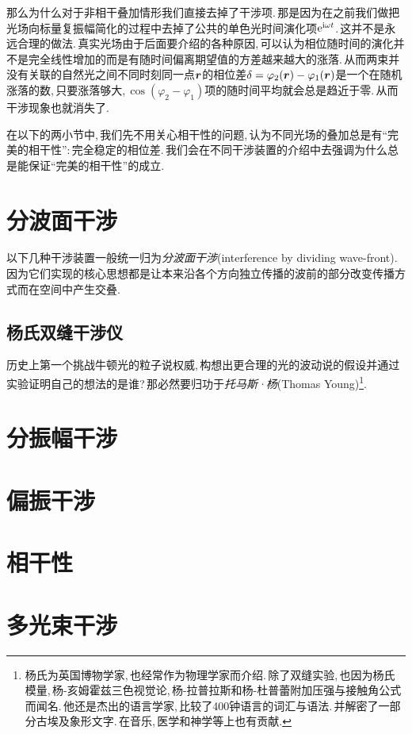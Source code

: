 那么为什么对于非相干叠加情形我们直接去掉了干涉项.\,那是因为在之前我们做把光场向标量复振幅简化的过程中去掉了公共的单色光时间演化项${\rm e} ^{{\rm i} \omega t}$.\,这并不是永远合理的做法.\,真实光场由于后面要介绍的各种原因,\,可以认为相位随时间的演化并不是完全线性增加的而是有随时间偏离期望值的方差越来越大的涨落.\,从而两束并没有关联的自然光之间不同时刻同一点$\boldsymbol{r}$的相位差$\delta=\varphi_2(\boldsymbol{r})-\varphi_1(\boldsymbol{r})$是一个在随机涨落的数,\,只要涨落够大,\,$\cos (\varphi_2-\varphi_1)$项的随时间平均就会总是趋近于零.\,从而干涉现象也就消失了.

在以下的两小节中,\,我们先不用关心相干性的问题,\,认为不同光场的叠加总是有``完美的相干性'':\,完全稳定的相位差.\,我们会在不同干涉装置的介绍中去强调为什么总是能保证``完美的相干性''的成立.




\section{分波面干涉}

以下几种干涉装置一般统一归为\emph{分波面干涉}(interference by dividing wave-front).\,因为它们实现的核心思想都是让本来沿各个方向独立传播的波前的部分改变传播方式而在空间中产生交叠.

\subsection{杨氏双缝干涉仪}

历史上第一个挑战牛顿光的粒子说权威,\,构想出更合理的光的波动说的假设并通过实验证明自己的想法的是谁?\,那必然要归功于\emph{托马斯·杨}(Thomas Young)\footnote{杨氏为英国博物学家,\,也经常作为物理学家而介绍.\,除了双缝实验,\,也因为杨氏模量,\,杨-亥姆霍兹三色视觉论,\,杨-拉普拉斯和杨-杜普蕾附加压强与接触角公式而闻名.\,他还是杰出的语言学家,\,比较了400钟语言的词汇与语法.\,并解密了一部分古埃及象形文字.\,在音乐,\,医学和神学等上也有贡献.}.\,

\section{分振幅干涉}

\section{偏振干涉}

\section{相干性}

\section{多光束干涉}

